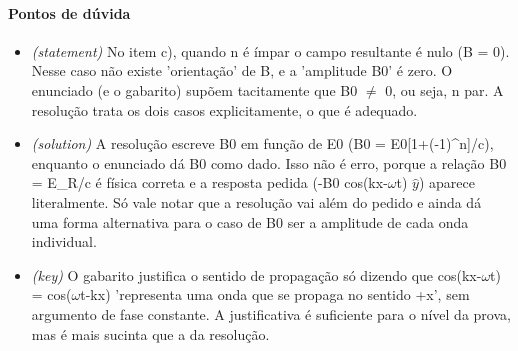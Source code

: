 \documentclass{article}%
\begin{document}
\paragraph{Pontos de dúvida}%
\begin{itemize}%
\item%
\textit{(statement)} No item c), quando n é ímpar o campo resultante é nulo (B = 0). Nesse caso não existe 'orientação' de B, e a 'amplitude B0' é zero. O enunciado (e o gabarito) supõem tacitamente que B0 $\neq$ 0, ou seja, n par. A resolução trata os dois casos explicitamente, o que é adequado.%
\item%
\textit{(solution)} A resolução escreve B0 em função de E0 (B0 = E0{[}1+(-1)\^{}n{]}/c), enquanto o enunciado dá B0 como dado. Isso não é erro, porque a relação B0 = E\_R/c é física correta e a resposta pedida (-B0 cos(kx-$\omega$t) $\hat y$) aparece literalmente. Só vale notar que a resolução vai além do pedido e ainda dá uma forma alternativa para o caso de B0 ser a amplitude de cada onda individual.%
\item%
\textit{(key)} O gabarito justifica o sentido de propagação só dizendo que cos(kx-$\omega$t) = cos($\omega$t-kx) 'representa uma onda que se propaga no sentido +x', sem argumento de fase constante. A justificativa é suficiente para o nível da prova, mas é mais sucinta que a da resolução.%
\end{itemize}%
\end{document}
